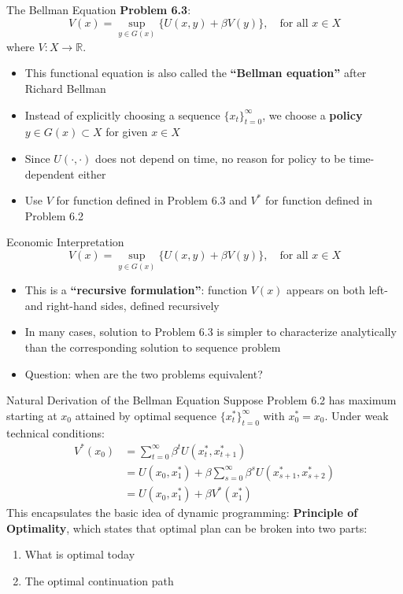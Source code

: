 \documentclass[9pt,aspectratio=169]{beamer}
\newcommand{\R}{\mathbb{R}}
\begin{document}
\begin{frame}{The Bellman Equation}
\textbf{Problem 6.3}:
$$V(x) = \sup_{y \in G(x)} \{U(x,y) + \beta V(y)\}, \quad \text{for all } x \in X$$
where $V: X \to \R$.

\begin{itemize}
    \item This functional equation is also called the \textbf{``Bellman
      equation''} after Richard Bellman
    \item Instead of explicitly choosing a sequence
    $\{x_t\}_{t=0}^{\infty}$, we choose a \textbf{policy} $y \in G(x)
    \subset X$ for given $x \in X$
    \item Since $U(\cdot,\cdot)$ does not depend on time, no reason for
    policy to be time-dependent either
    \item Use $V$ for function defined in Problem 6.3 and $V^*$ for function
    defined in Problem 6.2
\end{itemize}
\end{frame}

\begin{frame}{Economic Interpretation}
$$V(x) = \sup_{y \in G(x)} \{U(x,y) + \beta V(y)\}, \quad \text{for all } x \in X$$
\begin{itemize}
    \item This is a \textbf{``recursive formulation''}: function $V(x)$
    appears on both left- and right-hand sides, defined recursively
    \item In many cases, solution to Problem 6.3 is simpler to characterize
    analytically than the corresponding solution to sequence problem
    \item Question: when are the two problems equivalent?
\end{itemize}
\end{frame}

\begin{frame}{Natural Derivation of the Bellman Equation}
    Suppose Problem 6.2 has maximum starting at $x_0$ attained by optimal
    sequence $\{x^*_t\}_{t=0}^{\infty}$ with $x^*_0 = x_0$. Under weak
    technical conditions:
    \begin{align*}
        V^*(x_0) &= \sum_{t=0}^{\infty} \beta^t U(x^*_t, x^*_{t+1})\\
        &= U(x_0, x^*_1) + \beta \sum_{s=0}^{\infty} \beta^s U(x^*_{s+1}, x^*_{s+2})\\
        &= U(x_0, x^*_1) + \beta V^*(x^*_1)
    \end{align*}
    This encapsulates the basic idea of dynamic programming:
    \textbf{Principle of Optimality}, which states that optimal plan can be
    broken into two parts:
    \begin{enumerate}
        \item What is optimal today
        \item The optimal continuation path
    \end{enumerate}
\end{frame}
\end{document}
